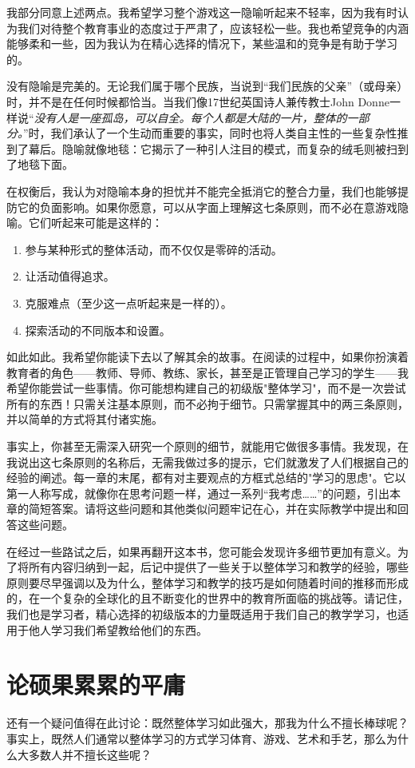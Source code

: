 我部分同意上述两点。我希望学习整个游戏这一隐喻听起来不轻率，因为我有时认为我们对待整个教育事业的态度过于严肃了，应该轻松一些。我也希望竞争的内涵能够柔和一些，因为我认为在精心选择的情况下，某些温和的竞争是有助于学习的。

没有隐喻是完美的。无论我们属于哪个民族，当说到“我们民族的父亲”（或母亲）时，并不是在任何时候都恰当。当我们像17世纪英国诗人兼传教士John Donne一样说“\textit{没有人是一座孤岛，可以自全。每个人都是大陆的一片，整体的一部分。}”时，我们承认了一个生动而重要的事实，同时也将人类自主性的一些复杂性推到了幕后。隐喻就像地毯：它揭示了一种引人注目的模式，而复杂的绒毛则被扫到了地毯下面。

在权衡后，我认为对隐喻本身的担忧并不能完全抵消它的整合力量，我们也能够提防它的负面影响。如果你愿意，可以从字面上理解这七条原则，而不必在意游戏隐喻。它们听起来可能是这样的：
\begin{enumerate}
\item 参与某种形式的整体活动，而不仅仅是零碎的活动。
\item 让活动值得追求。
\item 克服难点（至少这一点听起来是一样的）。
\item 探索活动的不同版本和设置。
\end{enumerate}

如此如此。我希望你能读下去以了解其余的故事。在阅读的过程中，如果你扮演着教育者的角色——教师、导师、教练、家长，甚至是正管理自己学习的学生——我希望你能尝试一些事情。你可能想构建自己的初级版"整体学习"，而不是一次尝试所有的东西！只需关注基本原则，而不必拘于细节。只需掌握其中的两三条原则，并以简单的方式将其付诸实施。

事实上，你甚至无需深入研究一个原则的细节，就能用它做很多事情。我发现，在我说出这七条原则的名称后，无需我做过多的提示，它们就激发了人们根据自己的经验的阐述。每一章的末尾，都有对主要观点的方框式总结的"学习的思虑"。它以第一人称写成，就像你在思考问题一样，通过一系列“我考虑……”的问题，引出本章的简短答案。请将这些问题和其他类似问题牢记在心，并在实际教学中提出和回答这些问题。

在经过一些路试之后，如果再翻开这本书，您可能会发现许多细节更加有意义。为了将所有内容归纳到一起，后记中提供了一些关于以整体学习和教学的经验，哪些原则要尽早强调以及为什么，整体学习和教学的技巧是如何随着时间的推移而形成的，在一个复杂的全球化的且不断变化的世界中的教育所面临的挑战等。请记住，我们也是学习者，精心选择的初级版本的力量既适用于我们自己的教学学习，也适用于他人学习我们希望教给他们的东西。

\section*{论硕果累累的平庸}
还有一个疑问值得在此讨论：既然整体学习如此强大，那我为什么不擅长棒球呢？事实上，既然人们通常以整体学习的方式学习体育、游戏、艺术和手艺，那么为什么大多数人并不擅长这些呢？

